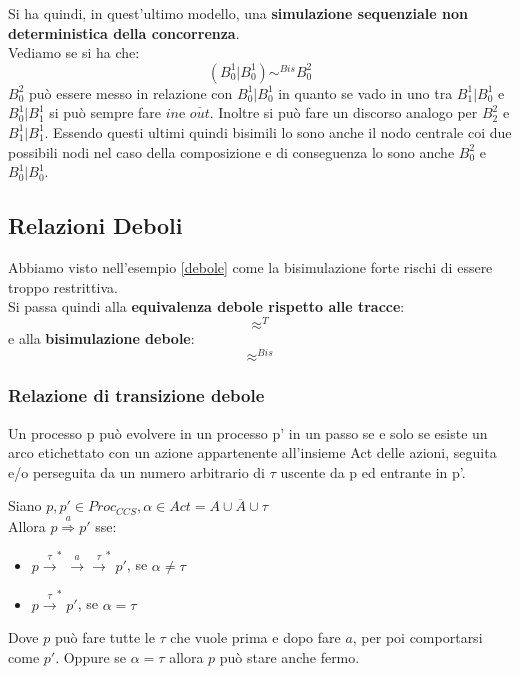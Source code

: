 \begin{esempio}
\begin{center}
  \end{center}
  Si ha quindi, in quest'ultimo modello, una \textbf{simulazione sequenziale non
    deterministica della concorrenza}.\\
  Vediamo se si ha che:
  \[(B_0^1|B_0^1)\sim^{Bis}B_0^2\]
  $B_0^2$ può essere messo in relazione con $B_0^1|B_0^1$ in quanto se vado in
  uno tra $B_1^1|B_0^1$ e $B_0^1|B_1^1$ si può sempre fare $in $e
  $\overline{out}$. Inoltre si può fare un discorso analogo per $B_2^2$ e
  $B_1^1|B_1^1$. Essendo questi ultimi quindi bisimili lo sono anche il nodo
  centrale coi due possibili nodi nel caso della composizione e di conseguenza
  lo sono anche $B_0^2$ e $B_0^1|B_0^1$.
\end{esempio}
\subsection{Relazioni Deboli}
Abbiamo visto nell'esempio \ref{debole} come la bisimulazione forte rischi di
essere troppo restrittiva.\\
Si passa quindi alla \textbf{equivalenza debole rispetto alle tracce}:
\[\approx^{T}\]
e alla \textbf{bisimulazione debole}:
\[\approx^{Bis}\]
\subsubsection{Relazione di transizione debole}
Un processo p può evolvere in un processo p’ in un passo se e solo se esiste un arco
etichettato con un azione appartenente all’insieme Act delle azioni, seguita e/o perseguita da
un numero arbitrario di $\tau$ uscente da p ed entrante in p'.
\begin{definizione}
  Siano $p,p' \in Proc_{CCS}, \alpha \in Act=A\cup \overline{A}\cup \tau$\\
  Allora $p\stackrel{a}{\Rightarrow}p'$ sse:
  \begin{itemize}
      \item $p\stackrel{\tau}{\rightarrow}^*
      \stackrel{a}{\rightarrow}\stackrel{\tau}{\rightarrow}^*p'$, se $\alpha \neq \tau$
      \item   $p\stackrel{\tau}{\rightarrow}^*p'$, se $\alpha = \tau$
  \end{itemize}
\end{definizione} \vspace{5mm} %
Dove $p$ può fare tutte le $\tau$ che vuole prima e dopo fare $a$, per poi comportarsi come $p'$. Oppure se $\alpha = \tau$ allora $p$ può stare anche fermo.
